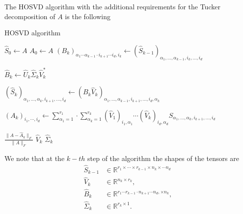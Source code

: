 \documentclass[a4paper]{article}
\begin{document}
The HOSVD algorithm with the additional requirements for the Tucker
decomposition of $A$ is the following
\begin{algorithm}[H]
  \caption{HOSVD algorithm}\label{alg: hosvd}
\begin{algorithmic}
    \State $\hat{S}_0 \gets A$
    \State $A_0 \gets A$
        \State $(B_k)_{\alpha_1\cdots\alpha_{k-1}\cdot i_{k+1} \cdots
        i_d,i_k} \gets (\hat{S}_{k-1})_{\alpha_1, \dots, \alpha_{k-1}, i_k,
        \dots, i_d}$ 

        \State $\hat{B}_k \gets \hat{U}_k \hat{\Sigma}_k \hat{V}_k^*$

        \State $(\hat{S}_k)_{\alpha_{1}, \dots, \alpha_{k}, i_{k+1},\dots,i_d
        } \gets (B_k \hat{V}_k)_{\alpha_{1}, \dots, \alpha_{k-1}, i_{k+1}, \dots,
        i_d, \alpha_k}$ 

        \State $(A_k)_{i_1,\cdots,i_d} \gets \sum_{\alpha_1=1}^{r_1} \cdot
        \sum_{\alpha_k=1}^{r_k} (\hat{V}_1)_{i_1,\alpha_1} \cdots (\hat{V}_k)_{i_d,\alpha_d}
        S_{\alpha_1, \dots, \alpha_{k}, i_{k+1}, \dots, i_d}$

        \State {} $\frac{\| A - \hat{A}_k\|_F}{\|A\|_F}$
        \State {} $\hat{V}_k$
        \State {} $\hat{\Sigma}_k$
        \EndFor
\end{algorithmic}
\end{algorithm}
We note that at the $k-th$ step of the algorithm the shapes of the tensors
are
\begin{align}
    \hat{S}_{k-1} &\in \mathbb{R}^{r_1 \times \cdots \times r_{k-1} \times n_k
    \times \cdots n_d} \\
        \hat{V}_k &\in \mathbb{R}^{n_k \times r_k},\\
        \hat{B}_k &\in \mathbb{R}^{r_1\cdots r_{k-1}\cdot n_{k+1} \cdots n_d,
        \times n_k},\\
        \hat{\Sigma}_k &\in \mathbb{R}^{r_k \times 1}.
\end{align}
\end{document}

